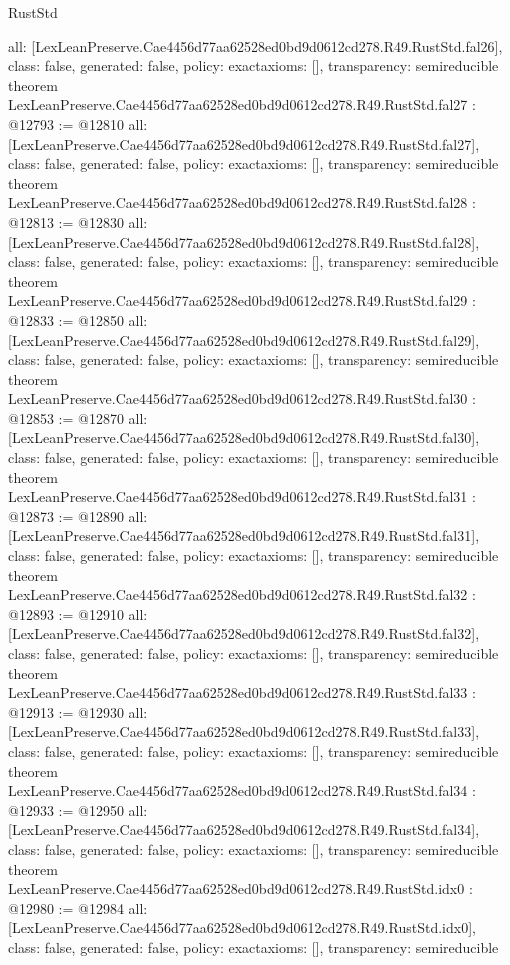 \begin{lexlean}{RustStd}
\begin{coremodule}
{  all: [LexLeanPreserve.Cae4456d77aa62528ed0bd9d0612cd278.R49.RustStd.fal26],
  class: false,
  generated: false,
  policy: exact{axioms: []},
  transparency: semireducible
}
theorem LexLeanPreserve.Cae4456d77aa62528ed0bd9d0612cd278.R49.RustStd.fal27 : @12793 := @12810 {
  all: [LexLeanPreserve.Cae4456d77aa62528ed0bd9d0612cd278.R49.RustStd.fal27],
  class: false,
  generated: false,
  policy: exact{axioms: []},
  transparency: semireducible
}
theorem LexLeanPreserve.Cae4456d77aa62528ed0bd9d0612cd278.R49.RustStd.fal28 : @12813 := @12830 {
  all: [LexLeanPreserve.Cae4456d77aa62528ed0bd9d0612cd278.R49.RustStd.fal28],
  class: false,
  generated: false,
  policy: exact{axioms: []},
  transparency: semireducible
}
theorem LexLeanPreserve.Cae4456d77aa62528ed0bd9d0612cd278.R49.RustStd.fal29 : @12833 := @12850 {
  all: [LexLeanPreserve.Cae4456d77aa62528ed0bd9d0612cd278.R49.RustStd.fal29],
  class: false,
  generated: false,
  policy: exact{axioms: []},
  transparency: semireducible
}
theorem LexLeanPreserve.Cae4456d77aa62528ed0bd9d0612cd278.R49.RustStd.fal30 : @12853 := @12870 {
  all: [LexLeanPreserve.Cae4456d77aa62528ed0bd9d0612cd278.R49.RustStd.fal30],
  class: false,
  generated: false,
  policy: exact{axioms: []},
  transparency: semireducible
}
theorem LexLeanPreserve.Cae4456d77aa62528ed0bd9d0612cd278.R49.RustStd.fal31 : @12873 := @12890 {
  all: [LexLeanPreserve.Cae4456d77aa62528ed0bd9d0612cd278.R49.RustStd.fal31],
  class: false,
  generated: false,
  policy: exact{axioms: []},
  transparency: semireducible
}
theorem LexLeanPreserve.Cae4456d77aa62528ed0bd9d0612cd278.R49.RustStd.fal32 : @12893 := @12910 {
  all: [LexLeanPreserve.Cae4456d77aa62528ed0bd9d0612cd278.R49.RustStd.fal32],
  class: false,
  generated: false,
  policy: exact{axioms: []},
  transparency: semireducible
}
theorem LexLeanPreserve.Cae4456d77aa62528ed0bd9d0612cd278.R49.RustStd.fal33 : @12913 := @12930 {
  all: [LexLeanPreserve.Cae4456d77aa62528ed0bd9d0612cd278.R49.RustStd.fal33],
  class: false,
  generated: false,
  policy: exact{axioms: []},
  transparency: semireducible
}
theorem LexLeanPreserve.Cae4456d77aa62528ed0bd9d0612cd278.R49.RustStd.fal34 : @12933 := @12950 {
  all: [LexLeanPreserve.Cae4456d77aa62528ed0bd9d0612cd278.R49.RustStd.fal34],
  class: false,
  generated: false,
  policy: exact{axioms: []},
  transparency: semireducible
}
theorem LexLeanPreserve.Cae4456d77aa62528ed0bd9d0612cd278.R49.RustStd.idx0 : @12980 := @12984 {
  all: [LexLeanPreserve.Cae4456d77aa62528ed0bd9d0612cd278.R49.RustStd.idx0],
  class: false,
  generated: false,
  policy: exact{axioms: []},
  transparency: semireducible
}
\end{coremodule}
\end{lexlean}
